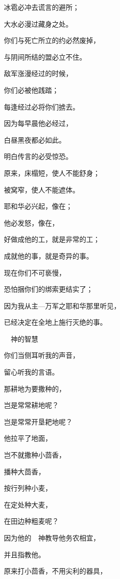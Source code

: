 {\par }{\Q 冰雹必冲去谎言的避所；
\par }{\Q 大水必漫过藏身之处。
\par }{\Q {}你们与死亡所立的约必然废掉，
\par }{\Q 与阴间所结的盟必立不住。
\par }{\Q 敌军涨漫经过的时候，
\par }{\Q 你们必被他践踏；
\par }{\Q {}每逢经过必将你们掳去。
\par }{\Q 因为每早晨他必经过，
\par }{\Q 白昼黑夜都必如此。
\par }{\Q 明白传言的必受惊恐。
\par }{\Q {}原来，床榻短，使人不能舒身；
\par }{\Q 被窝窄，使人不能遮体。
\par }{\Q {}耶和华必兴起，像在{}；
\par }{\Q 他必发怒，像在{}，
\par }{\Q 好做成他的工，就是非常的工；
\par }{\Q 成就他的事，就是奇异的事。
\par }{\Q {}现在你们不可亵慢，
\par }{\Q 恐怕捆你们的绑索更结实了；
\par }{\Q 因为我从主—万军之耶和华那里听见，
\par }{\Q 已经决定在全地上施行灭绝的事。
\par }{\SH 　神的智慧
\par }{\Q {}你们当侧耳听我的声音，
\par }{\Q 留心听我的言语。
\par }{\Q {}那耕地为要撒种的，
\par }{\Q 岂是常常耕地呢？
\par }{\Q 岂是常常开垦耙地呢？
\par }{\Q {}他拉平了地面，
\par }{\Q 岂不就撒种小茴香，
\par }{\Q 播种大茴香，
\par }{\Q 按行列种小麦，
\par }{\Q 在定处种大麦，
\par }{\Q 在田边种粗麦呢？
\par }{\Q {}因为他的　神教导他务农相宜，
\par }{\Q 并且指教他。
\par }{\BB \par }{\Q {}原来打小茴香，不用尖利的器具，
}
